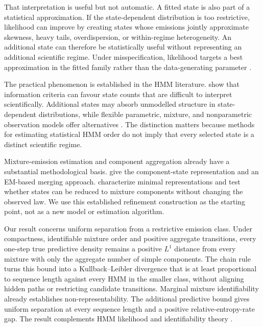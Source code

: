 \documentclass[11pt]{article}
\theoremstyle{definition}
\begin{document}
That interpretation is useful but not automatic. A fitted state is also part
of a statistical approximation. If the state-dependent distribution is too
restrictive, likelihood can improve by creating states whose emissions jointly
approximate skewness, heavy tails, overdispersion, or within-regime
heterogeneity. An additional state can therefore be statistically useful
without representing an additional scientific regime. Under misspecification,
likelihood targets a best approximation in the fitted family rather than the
data-generating parameter \citep{White1982,DoucMoulines2012}.

The practical phenomenon is established in the HMM literature.
\citet{PohleEtAl2017} show that information criteria can favour state counts
that are difficult to interpret scientifically. Additional states may absorb
unmodelled structure in state-dependent distributions, while flexible
parametric, mixture, and nonparametric observation models offer alternatives
\citep{Dannemann2012,DannemannEtAl2014,LangrockEtAl2015,LangrockEtAl2018}.
The distinction matters because methods for estimating statistical HMM order
\citep{GassiatKeribin2000,GassiatRousseau2014,Lehericy2019,ZouEtAl2024,LinHuang2025}
do not imply that every selected state is a distinct scientific regime.

Mixture-emission estimation and component aggregation already have a substantial
methodological basis. \citet{VolantEtAl2014} give the component-state
representation and an EM-based merging approach. \citet{HolzmannSchwaiger2015}
characterize minimal representations and test whether states can be reduced
to mixture components without changing the observed law. We use this
established refinement construction as the starting point, not as a new
model or estimation algorithm.

Our result concerns uniform separation from a restrictive emission class.
Under compactness, identifiable mixture order and positive aggregate
transitions, every one-step true predictive density remains a positive
$L^1$ distance from every mixture with only the aggregate number of simple
components. The chain rule turns this bound into a Kullback--Leibler divergence that is
at least proportional to sequence length against every HMM in the smaller
class, without aligning hidden paths or restricting candidate transitions.
Marginal mixture identifiability already establishes non-representability.
The additional predictive bound gives uniform separation at every sequence
length and a positive relative-entropy-rate gap. The result
complements HMM likelihood and identifiability theory
\citep{Leroux1992,BickelEtAl1998,AllmanEtAl2009,GassiatEtAl2016,AlexandrovichEtAl2016}.
\end{document}
